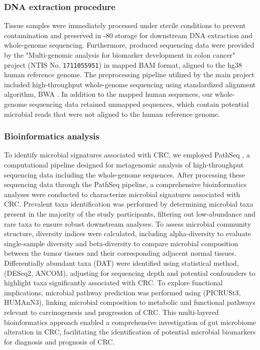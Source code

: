 \documentclass[11pt, a4paper, onecolumn, oneside]{report}
\begin{document}
            \subsubsection{DNA extraction procedure}
                Tissue samples were immediately processed under sterile conditions to prevent contamination and preserved in -80 \textcelsius storage for downstream DNA extraction and whole-genome sequencing. Furthermore, produced sequencing data were provided by the "Multi-genomic analysis for biomarker development in colon cancer" project (NTIS No. \texttt{1711055951}) in mapped BAM format, aligned to the hg38 human reference genome. The preprocessing pipeline utilized by the main project included high-throughput whole-genome sequencing using standardized alignment algorithm, BWA \cite{BWA-1}. In addition to the mapped human sequences, our whole-genome sequencing data retained unmapped sequences, which contain potential microbial reads that were not aligned to the human reference genome.

            \subsubsection{Bioinformatics analysis}
                To identify microbial signatures associated with CRC, we employed PathSeq \cite{PathSeq-1, PathSeq-2}, a computational pipeline designed for metagenomic analysis of high-throughput sequencing data including the whole-genome sequences. After processing these sequencing data through the PathSeq pipeline, a comprehensive bioinformatics analyses were conducted to characterize microbial signatures associated with CRC. Prevalent taxa identification was performed by determining microbial taxa present in the majority of the study participants, filtering out low-abundance and rare taxa to ensure robust downstream analyses. To assess microbial community structure, diversity indices were calculated, including alpha-diversity to evaluate single-sample diversity and beta-diversity to compare microbial composition between the tumor tissues and their corresponding adjacent normal tissues. Differentially abundant taxa (DAT) were identified using statistical method, (DESeq2, ANCOM), adjusting for sequencing depth and potential confounders to highlight taxa significantly associated with CRC. To explore functional implications, microbial pathway prediction was performed using (PICRUSt3, HUMAnN3), linking microbial composition to metabolic and functional pathways relevant to carcinogenesis and progression of CRC. This multi-layered bioinformatics approach enabled a comprehensive investigation of gut microbiome alteration in CRC, facilitating the identification of potential microbial biomarkers for diagnosis and prognosis of CRC.
\end{document}
